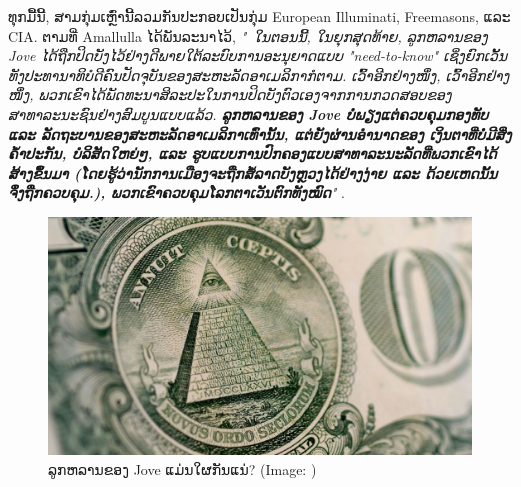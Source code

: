 \documentclass[10pt,twocolumn,letterpaper]{article}
\begin{document}
ທຸກມື້ນີ້, ສາມກຸ່ມເຫຼົ່ານີ້ລວມກັນປະກອບເປັນກຸ່ມ European Illuminati, Freemasons, ແລະ CIA. \cite{160}
ຕາມທີ່ Amallulla ໄດ້ພັນລະນາໄວ້, \textit{" ໃນຕອນນີ້, ໃນຍຸກສຸດທ້າຍ, ລູກຫລານຂອງ Jove ໄດ້ຖືກປິດບັງໄວ້ຢ່າງດີພາຍໃຕ້ລະບົບການອະນຸຍາດແບບ "need-to-know" ເຊິ່ງຍົກເວັ້ນທັງປະທານາທິບໍດີຄົນປັດຈຸບັນຂອງສະຫະລັດອາເມລິກາກໍຕາມ.  ເວົ້າອີກຢ່າງໜຶ່ງ, ເວົ້າອີກຢ່າງໜຶ່ງ, ພວກເຂົາໄດ້ພັດທະນາສິລະປະໃນການປິດບັງຕົວເອງຈາກການກວດສອບຂອງສາທາລະນະຊົນຢ່າງສົມບູນແບບແລ້ວ. \textbf{ລູກຫລານຂອງ Jove ບໍ່ພຽງແຕ່ຄວບຄຸມກອງທັບ ແລະ ລັດຖະບານຂອງສະຫະລັດອາເມລິກາເທົ່ານັ້ນ, ແຕ່ຍັງຜ່ານອຳນາດຂອງ ເງິນຕາທີ່ບໍ່ມີສິ່ງຄໍ້າປະກັນ, ບໍລິສັດໃຫຍ່ໆ, ແລະ ຮູບແບບການປົກຄອງແບບສາທາລະນະລັດທີ່ພວກເຂົາໄດ້ສ້າງຂຶ້ນມາ (ໂດຍຮູ້ວ່ານັກການເມືອງຈະຖືກສໍ້ລາດບັງຫຼວງໄດ້ຢ່າງງ່າຍ ແລະ ດ້ວຍເຫດນັ້ນຈຶ່ງຖືກຄວບຄຸມ.), ພວກເຂົາຄວບຄຸມໂລກຕາເວັນຕົກທັງໝົດ}"} \cite{33,34}. \cite{161}
\begin{figure}[t]
\begin{center}
   \includegraphics[width=1\linewidth]{illuminati.jpg}
\end{center}
   \caption{ລູກຫລານຂອງ Jove ແມ່ນໃຜກັນແນ່?
(Image: \cite{35}) \cite{162}}
\label{fig:10}
\label{fig:onecol}
\end{figure}
\end{document}
